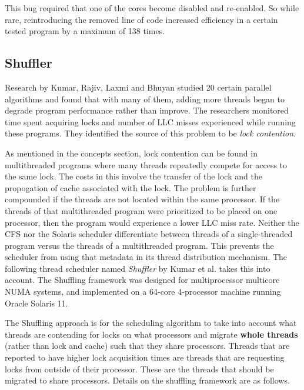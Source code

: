 \documentclass{sig-alternate}
\begin{document}
This bug required that one of the cores become disabled and re-enabled. So while rare, reintroducing the removed line of code increased efficiency in a certain tested program by a maximum of 138 times.~\cite{Lozi:2016}

\subsection{Shuffler}
\label{sec:shuffler}

Research by Kumar, Rajiv, Laxmi and Bhuyan studied 20 certain parallel algorithms and found that with many of them, adding more threads began to degrade program performance rather than improve. The researchers monitored time spent acquiring locks and number of LLC misses experienced while running these programs. They identified the source of this problem to be \emph{lock contention}.

As mentioned in the concepts section, lock contention can be found in multithreaded programs where many threads repeatedly compete for access to the same lock. The costs in this involve the transfer of the lock and the propogation of cache associated with the lock. The problem is further compounded if the threads are not located within the same processor. If the threads of that multithreaded program were prioritized to be placed on one processor, then the program would experience a lower LLC miss rate. Neither the CFS nor the Solaris scheduler differentiate between threads of a single-threaded program versus the threads of a multithreaded program. This prevents the scheduler from using that metadata in its thread distribution mechanism. The following thread scheduler named \emph{Shuffler} by Kumar et al. takes this into account. The Shuffling framework was designed for multiprocessor multicore NUMA systems, and implemented on a 64-core 4-processor machine running Oracle Solaris 11.~\cite{Kumar:2014}

The Shuffling approach is for the scheduling algorithm to take into account what threads are contending for locks on what processors and migrate \textbf{whole threads} (rather than lock and cache) such that they share processors. Threads that are reported to have higher lock acquisition times are threads that are requesting locks from outside of their processor. These are the threads that should be migrated to share processors. Details on the shuffling framework are as follows.~\cite{Kumar:2014}
\end{document}
